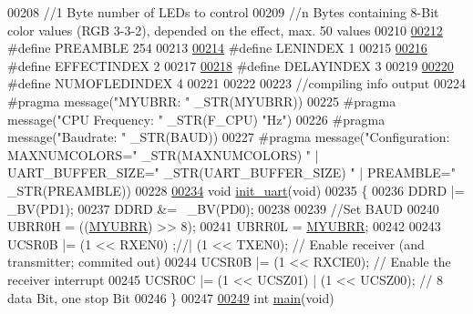 \begin{DoxyCode}
{00208 \textcolor{comment}{//1 Byte number of LEDs to control}
00209 \textcolor{comment}{//n Bytes containing 8-Bit color values (RGB 3-3-2), depended on the effect, max. 50 values}
00210 
\hypertarget{ws2811lichterkette_8c_source_l00212}{}\hyperlink{ws2811lichterkette_8c_a8aac8c5098aaf915463fb31715efa09f}{00212} \textcolor{preprocessor}{#define PREAMBLE 254        }
00213 
\hypertarget{ws2811lichterkette_8c_source_l00214}{}\hyperlink{ws2811lichterkette_8c_aec9ae4a8d59e838ac8ed93ad0de8e827}{00214} \textcolor{preprocessor}{#define LENINDEX 1          }
00215 
\hypertarget{ws2811lichterkette_8c_source_l00216}{}\hyperlink{ws2811lichterkette_8c_a8d4e4cf47dd6136ace963623e1a8e27c}{00216} \textcolor{preprocessor}{#define EFFECTINDEX 2       }
00217 
\hypertarget{ws2811lichterkette_8c_source_l00218}{}\hyperlink{ws2811lichterkette_8c_a9ff437877d0878dd16eacf103a1e1c40}{00218} \textcolor{preprocessor}{#define DELAYINDEX 3        }
00219 
\hypertarget{ws2811lichterkette_8c_source_l00220}{}\hyperlink{ws2811lichterkette_8c_afbc75dc20761a05dda7cbb70b9b322dd}{00220} \textcolor{preprocessor}{#define NUMOFLEDINDEX 4     }
00221 
00222 
00223 \textcolor{comment}{//compiling info output}
00224 \textcolor{preprocessor}{#pragma message("MYUBRR: " \_STR(MYUBRR))}
00225 \textcolor{preprocessor}{#pragma message("CPU Frequency: " \_STR(F\_CPU) "Hz")}
00226 \textcolor{preprocessor}{#pragma message("Baudrate: " \_STR(BAUD))}
00227 \textcolor{preprocessor}{#pragma message("Configuration: MAXNUMCOLORS=" \_STR(MAXNUMCOLORS)  " | UART\_BUFFER\_SIZE="
       \_STR(UART\_BUFFER\_SIZE) " | PREAMBLE=" \_STR(PREAMBLE))}
00228 
\hypertarget{ws2811lichterkette_8c_source_l00234}{}\hyperlink{ws2811lichterkette_8c_ac7b3df0fa68526d64c732d5f916e34b1}{00234} \textcolor{keywordtype}{void} \hyperlink{ws2811lichterkette_8c_ac7b3df0fa68526d64c732d5f916e34b1}{init\_uart}(\textcolor{keywordtype}{void})
00235 \{
00236     DDRD |= \_BV(PD1);
00237     DDRD &= ~\_BV(PD0);
00238     
00239      \textcolor{comment}{//Set BAUD}
00240      UBRR0H = ((\hyperlink{ws2811lichterkette_8c_a711e9130c825a7269c8c87dbb57a85e0}{MYUBRR}) >> 8);
00241      UBRR0L = \hyperlink{ws2811lichterkette_8c_a711e9130c825a7269c8c87dbb57a85e0}{MYUBRR};
00242      
00243      UCSR0B |= (1 << RXEN0) ;\textcolor{comment}{//| (1 << TXEN0);      // Enable receiver (and transmitter; commited out)}
00244      UCSR0B |= (1 << RXCIE0);                       \textcolor{comment}{// Enable the receiver interrupt}
00245      UCSR0C |= (1 << UCSZ01) | (1 << UCSZ00);       \textcolor{comment}{// 8 data Bit, one stop Bit}
00246 \}
00247 
\hypertarget{ws2811lichterkette_8c_source_l00249}{}\hyperlink{ws2811lichterkette_8c_a840291bc02cba5474a4cb46a9b9566fe}{00249} \textcolor{keywordtype}{int} \hyperlink{ws2811lichterkette_8c_a840291bc02cba5474a4cb46a9b9566fe}{main}(\textcolor{keywordtype}{void})
}
\end{DoxyCode}
